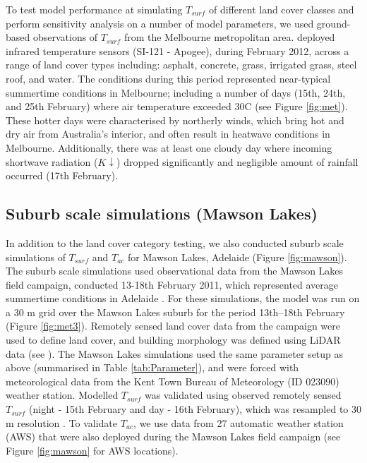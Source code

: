 \documentclass[journal abbreviation, manuscript]{copernicus}
\begin{document}
To test model performance at simulating $T_{surf}$ of different land cover classes and perform sensitivity analysis on a number of model parameters, we used ground-based observations of $T_{surf}$ from the Melbourne metropolitan area. \cite{Coutts2016a} deployed infrared temperature sensors (SI-121 - Apogee), during February 2012, across a range of land cover types including: asphalt, concrete, grass, irrigated grass, steel roof, and water. The conditions during this period represented near-typical summertime conditions in Melbourne; including a number of days (15th, 24th, and 25th February) where air temperature exceeded 30\degree C (see Figure \ref{fig:met}). These hotter days were characterised by northerly winds, which bring hot and dry air from Australia's interior, and often result in heatwave conditions in Melbourne. Additionally, there was at least one cloudy day where incoming shortwave radiation (\ensuremath{K\downarrow}) dropped significantly and negligible amount of rainfall occurred (17th February). 




\subsection{Suburb scale simulations (Mawson Lakes)}\label{sec:suburbsim} 
 
In addition to the land cover category testing, we also conducted suburb scale simulations of $T_{surf}$ and $T_{ac}$ for Mawson Lakes, Adelaide (Figure \ref{fig:mawson}). The suburb scale simulations used observational data from the Mawson Lakes field campaign, conducted 13-18th February 2011, which represented average summertime conditions in Adelaide \citep{Broadbent2017}. For these simulations, the model was run on a 30 m grid over the Mawson Lakes suburb for the period 13th--18th February (Figure \ref{fig:met3}).  Remotely sensed land cover data from the campaign were used to define land cover, and building morphology was defined using LiDAR data (see \cite{Broadbent2017}). The Mawson Lakes simulations used the same parameter setup as above (summarised in Table \ref{tab:Parameter}), and were forced with meteorological data from the Kent Town Bureau of Meteorology (ID 023090) weather station. Modelled $T_{surf}$ was validated using observed remotely sensed $T_{surf}$ (night - 15th February and day - 16th February), which was resampled to 30 m resolution \citep{Broadbent2017}. To validate $T_{ac}$, we use data from 27 automatic weather station (AWS) that were also deployed during the Mawson Lakes field campaign (see Figure \ref{fig:mawson} for AWS locations). 
 
\end{document}
